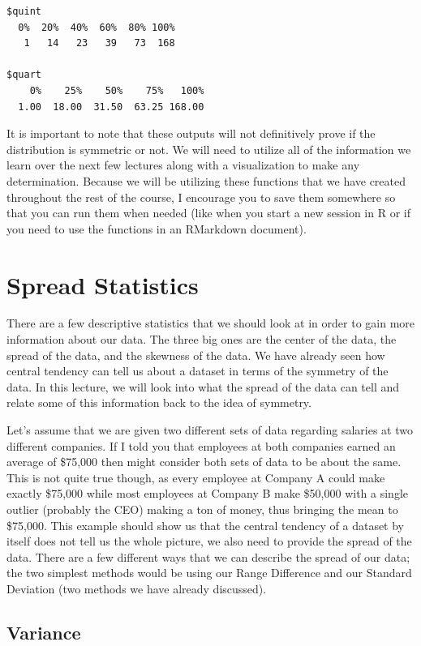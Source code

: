\documentclass[
  letterpaper,
  DIV=11,
  numbers=noendperiod]{scrreprt}
\begin{document}
\begin{verbatim}
$quint
  0%  20%  40%  60%  80% 100% 
   1   14   23   39   73  168 

$quart
    0%    25%    50%    75%   100% 
  1.00  18.00  31.50  63.25 168.00 
\end{verbatim}

It is important to note that these outputs will not definitively prove
if the distribution is symmetric or not. We will need to utilize all of
the information we learn over the next few lectures along with a
visualization to make any determination. Because we will be utilizing
these functions that we have created throughout the rest of the course,
I encourage you to save them somewhere so that you can run them when
needed (like when you start a new session in R or if you need to use the
functions in an RMarkdown document).

\section{Spread Statistics}\label{spread-statistics}

There are a few descriptive statistics that we should look at in order
to gain more information about our data. The three big ones are the
center of the data, the spread of the data, and the skewness of the
data. We have already seen how central tendency can tell us about a
dataset in terms of the symmetry of the data. In this lecture, we will
look into what the spread of the data can tell and relate some of this
information back to the idea of symmetry.

Let's assume that we are given two different sets of data regarding
salaries at two different companies. If I told you that employees at
both companies earned an average of \$75,000 then might consider both
sets of data to be about the same. This is not quite true though, as
every employee at Company A could make exactly \$75,000 while most
employees at Company B make \$50,000 with a single outlier (probably the
CEO) making a ton of money, thus bringing the mean to \$75,000. This
example should show us that the central tendency of a dataset by itself
does not tell us the whole picture, we also need to provide the spread
of the data. There are a few different ways that we can describe the
spread of our data; the two simplest methods would be using our Range
Difference and our Standard Deviation (two methods we have already
discussed).

\subsection{Variance}\label{variance}
\end{document}
